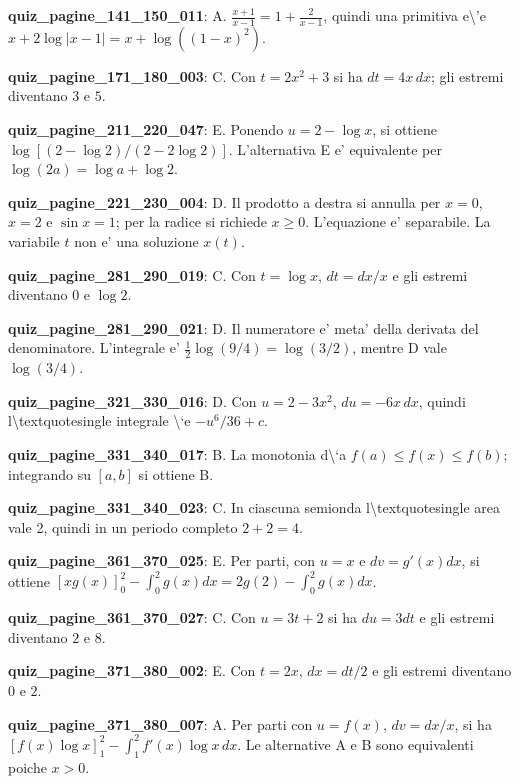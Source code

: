 \documentclass[11pt,a4paper]{article}
\newcounter{quiz}
\begin{document}
\noindent\textbf{quiz\_pagine\_141\_150\_011}: A. $\frac{x+1}{x-1}=1+\frac2{x-1}$, quindi una primitiva e\textbackslash{}'e $x+2\log|x-1|=x+\log((1-x)^2)$.\par\medskip
\noindent\textbf{quiz\_pagine\_171\_180\_003}: C. Con $t=2x^2+3$ si ha $dt=4x\,dx$; gli estremi diventano $3$ e $5$.\par\medskip
\noindent\textbf{quiz\_pagine\_211\_220\_047}: E. Ponendo $u=2-\log x$, si ottiene $\log[(2-\log2)/(2-2\log2)]$. L'alternativa E e' equivalente per $\log(2a)=\log a+\log2$.\par\medskip
\noindent\textbf{quiz\_pagine\_221\_230\_004}: D. Il prodotto a destra si annulla per $x=0$, $x=2$ e $\sin x=1$; per la radice si richiede $x\geq0$. L'equazione e' separabile. La variabile $t$ non e' una soluzione $x(t)$.\par\medskip
\noindent\textbf{quiz\_pagine\_281\_290\_019}: C. Con $t=\log x$, $dt=dx/x$ e gli estremi diventano 0 e $\log2$.\par\medskip
\noindent\textbf{quiz\_pagine\_281\_290\_021}: D. Il numeratore e' meta' della derivata del denominatore. L'integrale e' $\frac12\log(9/4)=\log(3/2)$, mentre D vale $\log(3/4)$.\par\medskip
\noindent\textbf{quiz\_pagine\_321\_330\_016}: D. Con $u=2-3x^2$, $du=-6x\,dx$, quindi l\textbackslash{}textquotesingle integrale \textbackslash{}`e $-u^6/36+c$.\par\medskip
\noindent\textbf{quiz\_pagine\_331\_340\_017}: B. La monotonia d\textbackslash{}`a $f(a)\leq f(x)\leq f(b)$; integrando su $[a,b]$ si ottiene B.\par\medskip
\noindent\textbf{quiz\_pagine\_331\_340\_023}: C. In ciascuna semionda l\textbackslash{}textquotesingle area vale 2, quindi in un periodo completo $2+2=4$.\par\medskip
\noindent\textbf{quiz\_pagine\_361\_370\_025}: E. Per parti, con $u=x$ e $dv=g\prime(x)dx$, si ottiene $[xg(x)]_0^2-\int_0^2g(x)dx=2g(2)-\int_0^2g(x)dx$.\par\medskip
\noindent\textbf{quiz\_pagine\_361\_370\_027}: C. Con $u=3t+2$ si ha $du=3dt$ e gli estremi diventano $2$ e $8$.\par\medskip
\noindent\textbf{quiz\_pagine\_371\_380\_002}: E. Con $t=2x$, $dx=dt/2$ e gli estremi diventano $0$ e $2$.\par\medskip
\noindent\textbf{quiz\_pagine\_371\_380\_007}: A. Per parti con $u=f(x)$, $dv=dx/x$, si ha $[f(x)\log x]_1^2-\int_1^2 f\prime(x)\log x\,dx$. Le alternative A e B sono equivalenti poiche $x>0$.\par\medskip
\end{document}
